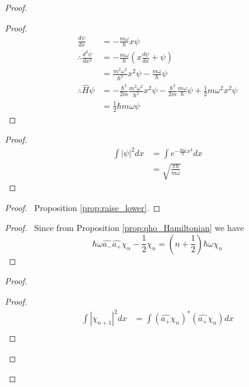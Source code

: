 \begin{proof}
\pf
{}
\begin{proof}
	\pf
	\begin{align*}
		\frac{d \psi}{dx} & = - \frac{m \omega}{ \hbar} x \psi \\
		\therefore \frac{d^2 \psi}{dx^2} & = - \frac{m \omega}{\hbar} \left(x \frac{d \psi}{dx} + \psi \right) \\
		& = \frac{m^2 \omega^2}{\hbar^2} x^2 \psi - \frac{m \omega}{\hbar} \psi \\
		\therefore \hat{H} \psi & = -\frac{\hbar^2}{2m} \frac{m^2 \omega^2}{\hbar^2} x^2 \psi - \frac{\hbar^2}{2m} \frac{m \omega}{\hbar} \psi + \frac{1}{2} m \omega^2 x^2 \psi \\
		& = \frac{1}{2} \hbar m \omega \psi
	\end{align*}
\end{proof}
\begin{proof}
	\pf
	\begin{align*}
		\int |\psi|^2 dx & = \int e^{- \frac{m \omega}{\hbar} x^2} dx \\
		& = \sqrt{\frac{\pi \hbar}{m \omega}}
	\end{align*}
\end{proof}
\begin{proof}
	\pf\ Proposition \ref{prop:raise_lower}.
\end{proof}
\begin{proof}
		\pf\ Since from Proposition \ref{prop:qho_Hamiltonian} we have
\[			\hbar \omega \hat{a_-} \hat{a_+} \chi_n - \frac{1}{2} \chi_n = (n + \frac{1}{2}) \hbar \omega \chi_n  \]
\end{proof}
\begin{proof}
	\pf
	\begin{proof}
		\pf
		\begin{align*}
			\int |\chi_{n+1}|^2 dx
			& = \int (\hat{a_+} \chi_n)^* (\hat{a_+} \chi_n) dx \\

\end{align*}
\end{proof}
\end{proof}
\end{proof}
